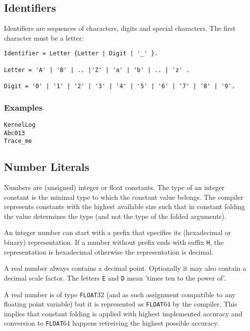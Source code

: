 \documentclass[a4wide,11pt]{article}
\newcommand{\FLOAT}{\lstinline"FLOAT"}
\begin{document}
\subsection{Identifiers}
Identifiers are sequences of characters, digits and special characters.
The first character must be a letter:

\begin{lstlisting}[style=ebnf]
Identifier = Letter {Letter | Digit | '_' }.

Letter = 'A' | 'B' | .. |'Z' | 'a' | 'b' | .. | 'z' .

Digit = '0' | '1' | '2' | '3' | '4' | '5' | '6' | '7' | '8' | '9'.
\end{lstlisting}


\begin{annotation}
\subsubsection{Examples}
\begin{lstlisting}[style=example,caption=Examples of valid identifiers]
KernelLog
Abc013
Trace_me
\end{lstlisting}
\end{annotation}

\subsection{Number Literals}
Numbers are (unsigned) integer or float constants.
The type of an integer constant is the minimal type to which the constant value belongs.
The compiler represents constants with the highest available size such that in constant folding the value determines the type (and not the type of the folded arguments).

An integer number can start with a prefix that specifies its (hexadecimal or binary) representation.
If a number without prefix ends with suffix \verb~H~, the representation is hexadecimal otherwise the representation is decimal.

A real number always contains a decimal point.
Optionally it may also contain a decimal scale factor.
The letters \verb~E~ and \verb~D~ mean 'times ten to the power of'.

A real number is of type \FLOAT32 (and as such assignment compatible to any floating point variable) but it is represented as \FLOAT64 by the compiler.
This implies that constant folding is applied with highest implemented accuracy and conversion to \FLOAT64 happens retreiving the highest possible accuracy.
\end{document}
